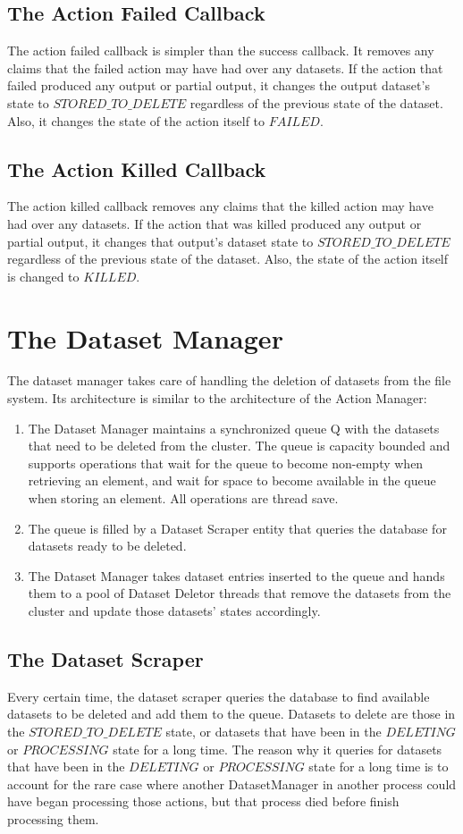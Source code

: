 \subsection{The Action Failed Callback}
The action failed callback is simpler than the success callback. It removes any claims that the failed action may have had over any datasets. If the action that failed produced any output or partial output, it changes the output dataset's state to $STORED\_TO\_DELETE$ regardless of the previous state of the dataset. Also, it changes the state of the action itself to $FAILED$.

\subsection{The Action Killed Callback}
The action killed callback removes any claims that the killed action may have had over any datasets. If the action that was killed produced any output or partial output, it changes that output's dataset state to $STORED\_TO\_DELETE$ regardless of the previous state of the dataset. Also, the state of the action itself is changed to $KILLED$.

\section{The Dataset Manager}
The dataset manager takes care of handling the deletion of datasets from the file system. Its architecture is similar to the architecture of the Action Manager:

\begin{enumerate}
\item The Dataset Manager maintains a synchronized queue Q with the datasets that need to be deleted from the cluster. The queue is capacity bounded and supports operations that wait for the queue to become non-empty when retrieving an element, and wait for space to become available in the queue when storing an element. All operations are thread save.
\item The queue is filled by a Dataset Scraper entity that queries the database for datasets ready to be deleted.
\item The Dataset Manager takes dataset entries inserted to the queue and hands them to a pool of Dataset Deletor threads that remove the datasets from the cluster and update those datasets' states accordingly.
\end{enumerate}

\subsection{The Dataset Scraper}
Every certain time, the dataset scraper queries the database to find available datasets to be deleted and add them to the queue. Datasets to delete are those in the $STORED\_TO\_DELETE$ state, or datasets that have been in the $DELETING$ or $PROCESSING$ state for a long time. The reason why it queries for datasets that have been in the $DELETING$ or $PROCESSING$ state for a long time is to account for the rare case where another DatasetManager in another process could have began processing those actions, but that process died before finish processing them.

